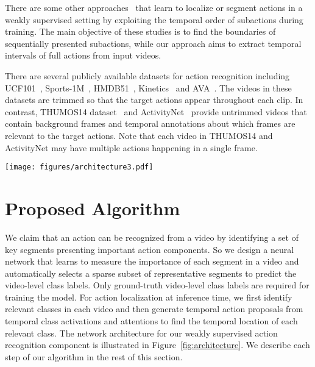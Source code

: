 \documentclass[10pt,twocolumn,letterpaper]{article}
\begin{document}
There are some other approaches~\cite{bojanowski14weakly,huang16connectionist,rechard17weakly} that learn to localize or segment actions in a weakly supervised setting by exploiting the temporal order of subactions during training.
The main objective of these studies is to find the boundaries of sequentially presented subactions, while our approach aims to extract temporal intervals of full actions from input videos.

There are several publicly available datasets for action recognition including UCF101~\cite{soomro12ucf101}, Sports-1M~\cite{karpathy14large}, HMDB51~\cite{kuehne11hmdb}, Kinetics~\cite{kay2017kinetics} and AVA~\cite{gu17ava}.
The videos in these datasets are trimmed so that the target actions appear throughout each clip.
In contrast, THUMOS14 dataset~\cite{jiang14thumos} and ActivityNet~\cite{heilbron15activitynet} provide untrimmed videos that contain background frames and temporal annotations about which frames are relevant to the target actions.
Note that each video in THUMOS14 and ActivityNet may have multiple actions happening in a single frame.
 


\begin{figure*}[t]
\captionsetup{font=small}
\centering
\texttt{[image: figures/architecture3.pdf]}
\caption{Network architecture for our weakly supervised temporal action localization model.  We first extract feature representations for a set of uniformly sampled video segments using a pretrained network. The attention module computes class-agnostic attention weights for each segment, which are used to generate a video-level representation via weighted temporal average pooling. The representation is given to the classification module that can be trained with regular cross entropy loss with video-level labels. An  loss is placed on the attention weights to enforce sparse attentions.}
\label{fig:architecture}
\end{figure*}

\section{Proposed Algorithm}
\label{sec:proposed}

We claim that an action can be recognized from a video by identifying a set of key segments presenting important action components. So we design a neural network that learns to measure the importance of each segment in a video and automatically selects a sparse subset of representative segments to predict the video-level class labels. Only ground-truth video-level class labels are required for training the model.
For action localization at inference time, we first identify relevant classes in each video and then generate temporal action proposals from temporal class activations and attentions to find the temporal location of each relevant class.
The network architecture for our weakly supervised action recognition component is illustrated in Figure~\ref{fig:architecture}.
We describe each step of our algorithm in the rest of this section.
\end{document}
